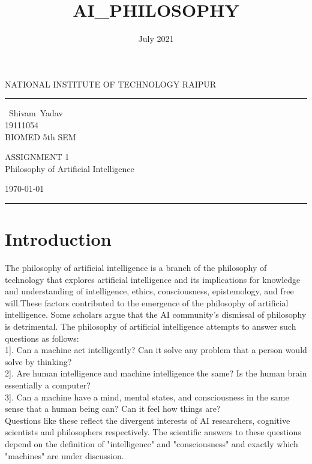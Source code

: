 \documentclass[a4paper,10pt]{article}
\begin{document}
 \begin{center}
    \large{NATIONAL INSTITUTE OF TECHNOLOGY RAIPUR}
\end{center}

\title{AI_PHILOSOPHY}
\date{July 2021}



    
    \hrule \medskip %
    \begin{minipage}{0.295\textwidth} 
    \raggedright
    \footnotesize
  Shivam Yadav\hfill\\
   19111054\hfill\\
   BIOMED 5th SEM
    \end{minipage}
    \begin{minipage}{0.4\textwidth} 
    \centering 
    \large 
    ASSIGNMENT 1\\
    \normalsize 
    Philosophy of Artificial Intelligence\\ 
    \end{minipage}
    \begin{minipage}{0.295\textwidth} 
    \raggedleft
    \today\hfill\\
    \end{minipage}
    \medskip\hrule 
    \bigskip
    
\section{Introduction}

The philosophy of artificial intelligence is a branch of the philosophy of technology that explores artificial intelligence and its implications for knowledge and understanding of intelligence, ethics, consciousness, epistemology, and free will.These factors contributed to the emergence of the philosophy of artificial intelligence. Some scholars argue that the AI community's dismissal of philosophy is detrimental.
The philosophy of artificial intelligence attempts to answer such questions as follows:\\
1]. Can a machine act intelligently? Can it solve any problem that a person would solve by thinking?\\
2]. Are human intelligence and machine intelligence the same? Is the human brain essentially a computer?\\
3]. Can a machine have a mind, mental states, and consciousness in the same sense that a human being can? Can it feel how things are?\\
Questions like these reflect the divergent interests of AI researchers, cognitive scientists and philosophers respectively. The scientific answers to these questions depend on the definition of "intelligence" and "consciousness" and exactly which "machines" are under discussion.
\end{document}
